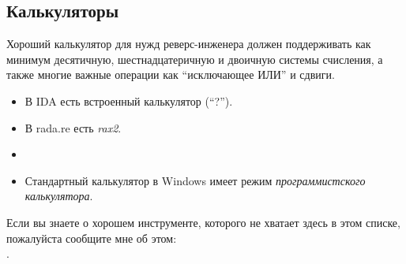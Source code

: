 \subsection{Калькуляторы}

Хороший калькулятор для нужд реверс-инженера должен поддерживать как минимум десятичную, шестнадцатеричную и двоичную системы
счисления, а также многие важные операции как ``исключающее ИЛИ'' и сдвиги.

\begin{itemize}

\item В IDA есть встроенный калькулятор (``?'').

\item В rada.re есть \emph{rax2}.

\item \ProgCalcURL

\item Стандартный калькулятор в Windows имеет режим \emph{программистского калькулятора}.

\end{itemize}


Если вы знаете о хорошем инструменте, которого не хватает здесь в этом списке, пожалуйста сообщите мне об этом:\\
\TT{\EMAILS}.

